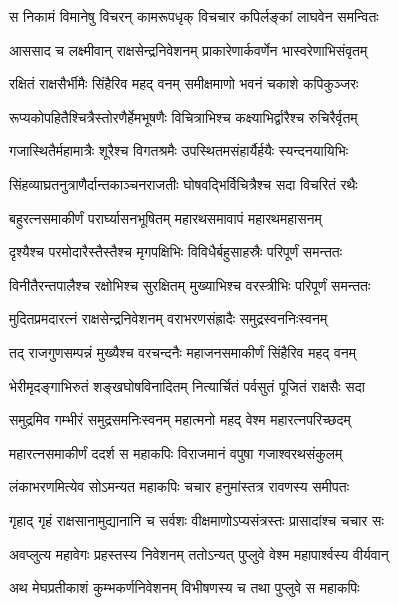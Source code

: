 
\twolineshloka
{स निकामं विमानेषु विचरन् कामरूपधृक्}
{विचचार कपिर्लङ्कां लाघवेन समन्वितः} %

\twolineshloka
{आससाद च लक्ष्मीवान् राक्षसेन्द्रनिवेशनम्}
{प्राकारेणार्कवर्णेन भास्वरेणाभिसंवृतम्} %

\twolineshloka
{रक्षितं राक्षसैर्भीमैः सिंहैरिव महद् वनम्}
{समीक्षमाणो भवनं चकाशे कपिकुञ्जरः} %

\twolineshloka
{रूप्यकोपहितैश्चित्रैस्तोरणैर्हेमभूषणैः}
{विचित्राभिश्च कक्ष्याभिर्द्वारैश्च रुचिरैर्वृतम्} %

\twolineshloka
{गजास्थितैर्महामात्रैः शूरैश्च विगतश्रमैः}
{उपस्थितमसंहार्यैर्हयैः स्यन्दनयायिभिः} %

\twolineshloka
{सिंहव्याघ्रतनुत्राणैर्दान्तकाञ्चनराजतीः}
{घोषवद्भिर्विचित्रैश्च सदा विचरितं रथैः} %

\twolineshloka
{बहुरत्नसमाकीर्णं परार्घ्यासनभूषितम्}
{महारथसमावापं महारथमहासनम्} %

\twolineshloka
{दृश्यैश्च परमोदारैस्तैस्तैश्च मृगपक्षिभिः}
{विविधैर्बहुसाहस्रैः परिपूर्णं समन्ततः} %

\twolineshloka
{विनीतैरन्तपालैश्च रक्षोभिश्च सुरक्षितम्}
{मुख्याभिश्च वरस्त्रीभिः परिपूर्णं समन्ततः} %

\twolineshloka
{मुदितप्रमदारत्नं राक्षसेन्द्रनिवेशनम्}
{वराभरणसंह्रादैः समुद्रस्वननिःस्वनम्} %

\twolineshloka
{तद् राजगुणसम्पन्नं मुख्यैश्च वरचन्दनैः}
{महाजनसमाकीर्णं सिंहैरिव महद् वनम्} %

\twolineshloka
{भेरीमृदङ्गाभिरुतं शङ्खघोषविनादितम्}
{नित्यार्चितं पर्वसुतं पूजितं राक्षसैः सदा} %

\twolineshloka
{समुद्रमिव गम्भीरं समुद्रसमनिःस्वनम्}
{महात्मनो महद् वेश्म महारत्नपरिच्छदम्} %

\twolineshloka
{महारत्नसमाकीर्णं ददर्श स महाकपिः}
{विराजमानं वपुषा गजाश्वरथसंकुलम्} %

\twolineshloka
{लंकाभरणमित्येव सोऽमन्यत महाकपिः}
{चचार हनुमांस्तत्र रावणस्य समीपतः} %

\twolineshloka
{गृहाद् गृहं राक्षसानामुद्यानानि च सर्वशः}
{वीक्षमाणोऽप्यसंत्रस्तः प्रासादांश्च चचार सः} %

\twolineshloka
{अवप्लुत्य महावेगः प्रहस्तस्य निवेशनम्}
{ततोऽन्यत् पुप्लुवे वेश्म महापार्श्वस्य वीर्यवान्} %

\twolineshloka
{अथ मेघप्रतीकाशं कुम्भकर्णनिवेशनम्}
{विभीषणस्य च तथा पुप्लुवे स महाकपिः} %

